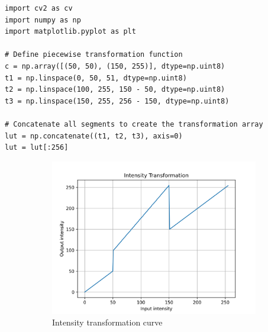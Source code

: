 \documentclass[10pt,a4paper]{article}
\begin{document}
\begin{lstlisting}[caption=Intensity transformation implementation]
import cv2 as cv
import numpy as np
import matplotlib.pyplot as plt

# Define piecewise transformation function
c = np.array([(50, 50), (150, 255)], dtype=np.uint8)
t1 = np.linspace(0, 50, 51, dtype=np.uint8)
t2 = np.linspace(100, 255, 150 - 50, dtype=np.uint8)
t3 = np.linspace(150, 255, 256 - 150, dtype=np.uint8)

# Concatenate all segments to create the transformation array
lut = np.concatenate((t1, t2, t3), axis=0)
lut = lut[:256]

\end{lstlisting}

\begin{figure}[H]
    \centering
    \begin{subfigure}{0.45\textwidth}
        \includegraphics[width=\textwidth]{task1/transformation_curve.png}
        \caption{Intensity transformation curve}
    \end{subfigure}
    \hfill
    \begin{subfigure}{0.25\textwidth}

\end{subfigure}
\end{figure}
\end{document}
